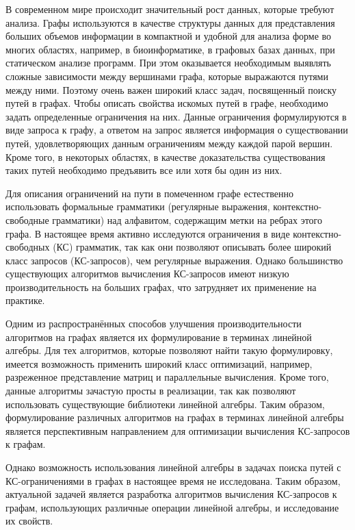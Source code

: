 
{\actuality} 
В современном мире происходит значительный рост данных, которые требуют анализа. Графы используются в качестве структуры данных для представления больших объемов информации в компактной и удобной для анализа форме во многих областях, например, в биоинформатике, в графовых базах данных, при статическом анализе программ. При этом оказывается необходимым выявлять сложные зависимости между вершинами графа, которые выражаются путями между ними. Поэтому очень важен широкий класс задач, посвященный поиску путей в графах. Чтобы описать свойства искомых путей в графе, необходимо задать определенные ограничения на них. Данные ограничения формулируются в виде запроса к графу, а ответом на запрос является информация о существовании путей, удовлетворяющих данным ограничениям между каждой парой вершин. Кроме того, в некоторых областях, в качестве доказательства существования таких путей необходимо предъявить все или хотя бы один из них.

Для описания ограничений на пути в помеченном графе естественно использовать формальные грамматики (регулярные выражения, контекстно-свободные грамматики) над алфавитом, содержащим метки на ребрах этого графа. В настоящее время активно исследуются ограничения в виде контекстно-свободных (КС) грамматик, так как они позволяют описывать более широкий класс запросов (КС-запросов), чем регулярные выражения. Однако большинство существующих алгоритмов вычисления КС-запросов имеют низкую производительность на больших графах, что затрудняет их применение на практике.

Одним из распространённых способов улучшения производительности алгоритмов на графах является их формулирование в терминах линейной алгебры. Для тех алгоритмов, которые позволяют найти такую формулировку, имеется возможность применить широкий класс оптимизаций, например, разреженное представление матриц и параллельные вычисления. Кроме того, данные алгоритмы зачастую просты в реализации, так как позволяют использовать существующие библиотеки линейной алгебры. Таким образом, формулирование различных алгоритмов на графах в терминах линейной алгебры является перспективным направлением для оптимизации вычисления КС-запросов к графам.

Однако возможность использования линейной алгебры в задачах поиска путей с КС-ограничениями в графах в настоящее время не исследована. Таким образом, актуальной задачей является разработка алгоритмов вычисления КС-запросов к графам, использующих различные операции линейной алгебры, и исследование их свойств.

